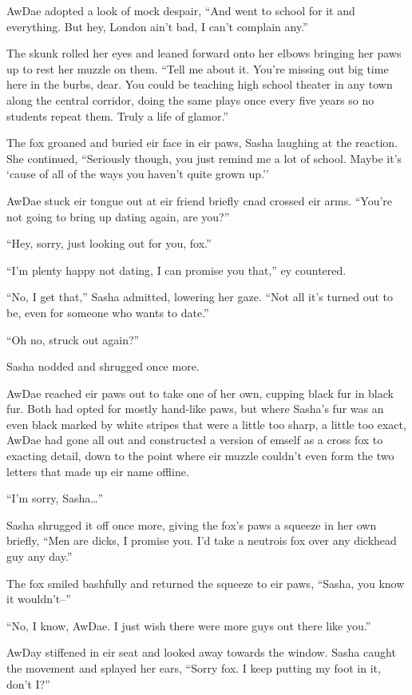 AwDae adopted a look of mock despair, ``And went to school for it and everything. But hey, London ain't bad, I can't complain any.''

The skunk rolled her eyes and leaned forward onto her elbows bringing her paws up to rest her muzzle on them. ``Tell me about it. You're missing out big time here in the burbs, dear. You could be teaching high school theater in any town along the central corridor, doing the same plays once every five years so no students repeat them. Truly a life of glamor.''

The fox groaned and buried eir face in eir paws, Sasha laughing at the reaction. She continued, ``Seriously though, you just remind me a lot of school. Maybe it's `cause of all of the ways you haven't quite grown up.''

AwDae stuck eir tongue out at eir friend briefly cnad crossed eir arms. ``You're not going to bring up dating again, are you?''

``Hey, sorry, just looking out for you, fox.''

``I'm plenty happy not dating, I can promise you that,'' ey countered.

``No, I get that,'' Sasha admitted, lowering her gaze. ``Not all it's turned out to be, even for someone who wants to date.''

``Oh no, struck out again?''

Sasha nodded and shrugged once more.

AwDae reached eir paws out to take one of her own, cupping black fur in black fur. Both had opted for mostly hand-like paws, but where Sasha's fur was an even black marked by white stripes that were a little too sharp, a little too exact, AwDae had gone all out and constructed a version of emself as a cross fox to exacting detail, down to the point where eir muzzle couldn't even form the two letters that made up eir name offline.

``I'm sorry, Sasha\ldots{}''

Sasha shrugged it off once more, giving the fox's paws a squeeze in her own briefly, ``Men are dicks, I promise you. I'd take a neutrois fox over any dickhead guy any day.''

The fox smiled bashfully and returned the squeeze to eir paws, ``Sasha, you know it wouldn't--''

``No, I know, AwDae. I just wish there were more guys out there like you.''

AwDay stiffened in eir seat and looked away towards the window. Sasha caught the movement and splayed her ears, ``Sorry fox. I keep putting my foot in it, don't I?''

